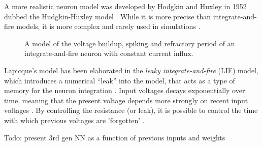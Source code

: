 \documentclass[report.tex]{subfiles}
\begin{document}
A more realistic neuron model was developed by Hodgkin
and Huxley in 1952 dubbed the Hudgkin-Huxley model \cite{Dayan2001}.
While it is more precise than integrate-and-fire models, it is
more complex \cite[p. 195]{Dayan2001} and rarely used in simulations
\cite{Albada2018, Dayan2001, Eliasmith2015}.

\begin{figure}
\centering

\caption{A model of the voltage buildup, spiking and refractory period
         of an integrate-and-fire  
         neuron with constant current influx.}
\label{fig:spiking}
\end{figure}

Lapicque's model has been elaborated in the \textit{leaky
integrate-and-fire} (LIF) 
model, which introduces a numerical ``leak''
into the model, that acts as a type of memory 
for the neuron integration \cite{Eliasmith2004, Eliasmith2015}.
Input voltages decays exponentially over time, meaning that the
present voltage depends more strongly on recent input voltages
\cite[p. 86]{Eliasmith2004}.
By controlling the resistance (or leak), it is possible to
control the time with which previous voltages are 'forgotten'
\cite{Eliasmith2004}.

Todo: present 3rd gen NN as a function of previous inputs and weights
\end{document}
